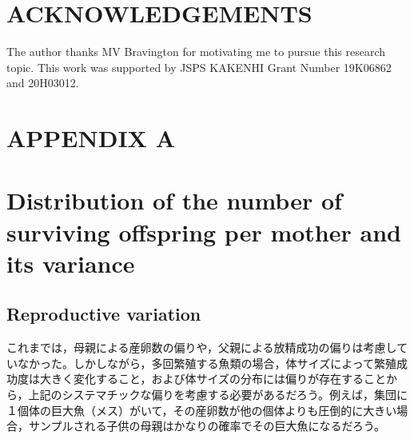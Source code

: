 \documentclass[AMA,STIX1COL]{WileyNJD-v2}
\begin{document}
\section{ACKNOWLEDGEMENTS} 

The author thanks MV Bravington for motivating me to pursue this research topic. This work was supported by JSPS KAKENHI Grant Number 19K06862 and 20H03012.


\clearpage

\section*{APPENDIX A}
\setcounter{equation}{0}

\section*{Distribution of the number of surviving offspring per mother and its variance}

\renewcommand{\theequation}{A\arabic{equation}}


\subsection{Reproductive variation}

これまでは，母親による産卵数の偏りや，父親による放精成功の偏りは考慮していなかった。しかしながら，多回繁殖する魚類の場合，体サイズによって繁殖成功度は大きく変化すること，および体サイズの分布には偏りが存在することから，上記のシステマチックな偏りを考慮する必要があるだろう。例えば，集団に１個体の巨大魚（メス）がいて，その産卵数が他の個体よりも圧倒的に大きい場合，サンプルされる子供の母親はかなりの確率でその巨大魚になるだろう。
\end{document}
